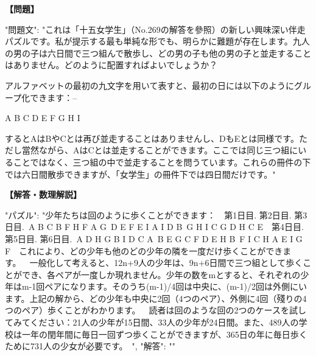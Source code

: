 \documentclass[10pt,a4paper,oneside,openany]{ltjsbook}
\begin{document}
\begin{tcolorbox}[colback=softblue,colframe=primaryblue,title=\textbf{第 272 問：THE NINE SCHOOLBOYS.},arc=2mm,boxrule=1pt,breakable]
\textbf{【問題】}\par\vspace{0.3em}
{
  "問題文": "これは「十五女学生」（No.269の解答を參照）の新しい興味深い伴走パズルです。私が提示する最も単純な形でも、明らかに難題が存在します。九人の男の子は六日間で三つ組んで散歩し、どの男の子も他の男の子と並走することはありません。どのように配置すればよいでしょうか？

アルファベットの最初の九文字を用いて表すと、最初の日には以下のようにグループ化できます：--

    A   B   C
    D   E   F
    G   H   I

するとAはBやCとは再び並走することはありませんし、DもEとは同様です。ただし當然ながら、AはCとは並走することができます。ここでは同じ三つ組にいることではなく、三つ組の中で並走することを問うています。これらの冊件の下では六日間散歩できますが、「女学生」の冊件下では四日間だけです。"
}
\tcblower
\textbf{【解答・数理解説】}\par\vspace{0.3em}
{
    "パズル": "少年たちは回のように歩くことができます：\
\
第1日目. 第2日目. 第3日目.\
 A B C     B F H     F A G\
 D E F     E I A     I D B\
 G H I     C G D     H C E\
\
第4日目. 第5日目. 第6日目.\
 A D H     G B I     D C A\
 B E G     C F D     E H B\
 F I C     H A E     I G F\
\
これにより、どの少年も他のどの少年の隣を一度だけ歩くことができます。\
\
一般化して考えると、12n+9人の少年は、9n+6日間で三つ組として歩くことができ、各ペアが一度しか現れません。少年の数をmとすると、それぞれの少年はm-1回ペアになります。そのうち(m-1)/4回は中央に、(m-1)/2回は外側にいます。上記の解から、どの少年も中央に2回（4つのペア）、外側に4回（殘りの4つのペア）歩くことがわかります。\
\
読者は回のような回の2つのケースを試してみてください：21人の少年が15日間、33人の少年が24日間。また、489人の学校は一年の閏年間に毎日一回ずつ歩くことができますが、365日の年に毎日歩くために731人の少女が必要です。\
",
    "解答": ""
}
\end{tcolorbox}
\end{document}
